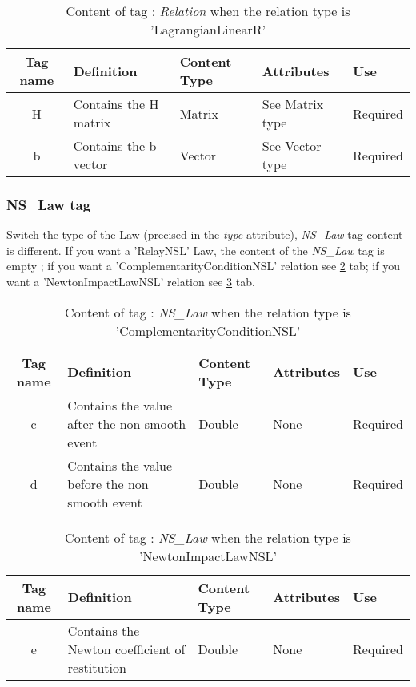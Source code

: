\begin{table}[!hbp]
\begin{center}
\begin{tabular}{|c|p{6cm}|p{2cm}|p{3cm}|p{2cm}|}
\hline
\bf{Tag name} & \bf{Definition} & \bf{Content Type} & \bf{Attributes} & \bf{Use}
\\\hline
\hline
H	          & Contains the H matrix & Matrix & See Matrix type &  Required \\
\hline
b	          & Contains the b vector & Vector & See Vector type &  Required \\
\hline
\end{tabular}
\end{center}
\caption{Content of tag : \textit{Relation}  when the relation type is 'LagrangianLinearR'}
\label{tab-RLL}
\end{table}



\subsubsection{NS\_Law tag}
\label{NSLawTag}

Switch the type of the Law (precised in the \textit{type} attribute), \textit{NS\_Law} tag content is different.
If you want a 'RelayNSL' Law, the content of the \textit{NS\_Law} tag is empty ; if you want a 'ComplementarityConditionNSL' relation see \ref{tab-CCNSLaw} tab; if you want
a 'NewtonImpactLawNSL' relation see \ref{tab-NILNSLaw} tab.




\begin{table}[!hbp]
\begin{center}
\begin{tabular}{|c|p{6cm}|p{2cm}|p{3cm}|p{2cm}|}
\hline
\bf{Tag name} & \bf{Definition} & \bf{Content Type} & \bf{Attributes} & \bf{Use}
\\\hline
\hline
c	          & Contains the value after the non smooth event & Double & None &  Required \\
\hline
d	          & Contains the value before the non smooth event & Double & None &  Required \\
\hline
\end{tabular}
\end{center}
\caption{Content of tag : \textit{NS\_Law} when the relation type is 'ComplementarityConditionNSL'}
\label{tab-CCNSLaw}
\end{table}

\begin{table}[!hbp]
\begin{center}
\begin{tabular}{|c|p{6cm}|p{2cm}|p{3cm}|p{2cm}|}
\hline
\bf{Tag name} & \bf{Definition} & \bf{Content Type} & \bf{Attributes} & \bf{Use}
\\\hline
\hline
e	          & Contains the Newton coefficient of restitution & Double & None &  Required \\
\hline
\end{tabular}
\end{center}
\caption{Content of tag : \textit{NS\_Law} when the relation type is 'NewtonImpactLawNSL'}
\label{tab-NILNSLaw}
\end{table}


